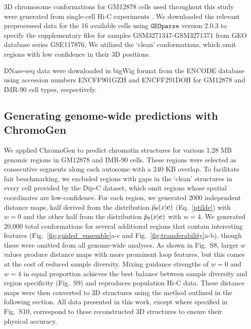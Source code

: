 \documentclass[12pt,letterpaper]{article}
\begin{document}
3D chromosome conformations for GM12878 cells used throughout this study were generated from single-cell Hi-C experiments \cite{Tan2018}. We downloaded the relevant preprocessed data for the 16 available cells using $\texttt{GEOparse}$ version 2.0.3 to specify the supplementary files for samples GSM3271347-GSM3271371 from GEO database series GSE117876. We utilized the `clean' conformations, which omit regions with low confidence in their 3D positions. 


DNase-seq data were downloaded in bigWig format from the ENCODE database~\cite{the_encode_project_consortium_integrated_2012} using accession numbers ENCFF901GZH and ENCFF291DOH for GM12878 and IMR-90 cell types, respectively. 


\subsection*{Generating genome-wide predictions with ChromoGen}

We applied ChromoGen to predict chromatin structures for various 1.28 MB genomic regions in GM12878 and IMR-90 cells. These regions were selected as consecutive segments along each autosome with a 240 KB overlap. %
To facilitate fair benchmarking, we excluded regions with gaps in the `clean' structures in every cell provided by the Dip-C dataset, which omit regions whose spatial coordinates are low-confidence. 
For each region, we generated 2000 independent distance maps, half derived from the distribution $\Tilde{p}_\theta(x\vert \boldsymbol{c})$ (Eq.~\ref{ptilde}) with $w=0$ and the other half from the distribution $\Tilde{p}_\theta(x\vert \boldsymbol{c})$ with $w=4$. 
We generated 20,000 total conformations for several additional regions that contain interesting features (Fig.~\ref{fig:guided_ensemble}a-c and Fig.~\ref{fig:transferability}a-b), though these were omitted from all genome-wide analyses. 
As shown in Fig.~S8, larger $w$ values produce distance maps with more prominent loop features, but this comes at the cost of reduced sample diversity. Mixing guidance strengths of $w=0$ and $w=4$ in equal proportion achieves the best balance between sample diversity and region specificity (Fig.~S9) and reproduces population Hi-C data. 
These distance maps were then converted to 3D structures using the method outlined in the following section. 
All data presented in this work, except where specified in Fig.~S10, correspond to these reconstructed 3D structures to ensure their physical accuracy. 
\end{document}
